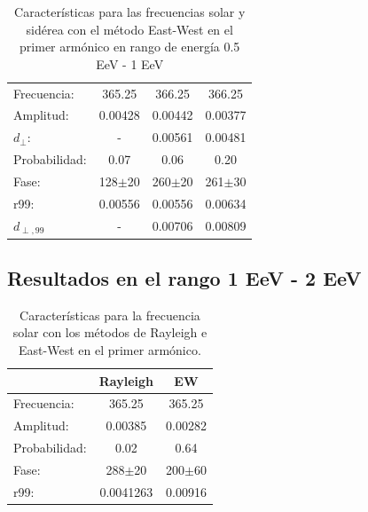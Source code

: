\begin{table}[H]
        \begin{small}
            \begin{center}
                \begin{tabular}[c]{l|c||c|c}
                    Frecuencia:     & 365.25	    & 366.25		& 366.25\cite{Aab_2020}\\
                    Amplitud:       & 0.00428       & 0.00442	    & 0.00377\\
                    $d_\perp$:      & -             & 0.00561       & 0.00481\\
                    Probabilidad:   & 0.07          & 0.06	        & 0.20\\
                    Fase:           & 128$\pm$20	& 260$\pm$20	& 261$\pm$30\\
                    r99:            & 0.00556	    & 0.00556       & 0.00634\\
                    $d_{\perp,99}$  & -             & 0.00706       &0.00809\\
                \end{tabular}
            \end{center}
        \end{small}
        \caption{Características para las frecuencias solar y sidérea con el método East-West en el primer armónico en rango de energía 0.5 EeV - 1 EeV}
        \label{tab:solar}
    \end{table}


\subsection*{Resultados en el rango 1 EeV - 2 EeV}
    \begin{table}[H]
        \begin{small}
            \begin{center}
                \begin{tabular}[c]{l|c|c}
                                    & Rayleigh      & EW            \\\hline
                    Frecuencia:     & 365.25	    & 365.25        \\
                    Amplitud:       & 0.00385       & 0.00282       \\
                    Probabilidad:   & 0.02          & 0.64          \\
                    Fase:           & 288$\pm$20    & 200$\pm$60    \\
                    r99:            & 0.0041263     & 0.00916       \\
                \end{tabular}
            \end{center}
        \end{small}
        \caption{Características para la frecuencia solar con los métodos de Rayleigh  e East-West en el primer armónico.}
        \label{tab:solar}
    \end{table}

